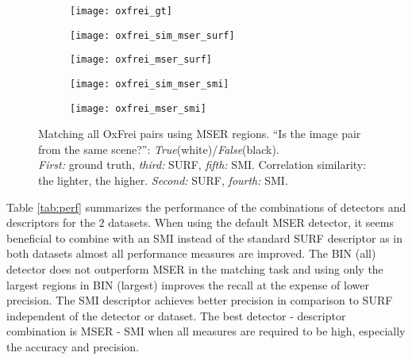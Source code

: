 \documentclass[a4paper,11pt]{article}
\begin{document}
\begin{figure}[h]
 \vspace{-10pt} 
\begin{center}
\begin{subfigure}[b]{0.18\textwidth}
  \texttt{[image: oxfrei\_gt]}
\end{subfigure}
\begin{subfigure}[b]{0.18\textwidth}
\texttt{[image: oxfrei\_sim\_mser\_surf]}
\end{subfigure}
\begin{subfigure}[b]{0.18\textwidth}
  \texttt{[image: oxfrei\_mser\_surf]}
\end{subfigure}
\begin{subfigure}[b]{0.18\textwidth}
\texttt{[image: oxfrei\_sim\_mser\_smi]}
\end{subfigure}
\begin{subfigure}[b]{0.18\textwidth}
  \texttt{[image: oxfrei\_mser\_smi]}
\end{subfigure}
\end{center}
\vspace{-20pt}

\caption{\footnotesize Matching all OxFrei pairs using MSER regions. ``Is the image pair from the same scene?'': {\em True}(white)/{\em False}(black). \\
{\em First:} ground truth, {\em third:} SURF, {\em fifth:} SMI. Correlation similarity: the lighter, the higher. {\em Second:} SURF, {\em fourth:} SMI. }
\label{fig:matching2}
  \vspace{-12pt}
\end{figure}


Table \ref{tab:perf} summarizes the performance of the combinations of detectors and descriptors for the $2$ datasets. When using the default MSER detector, it seems beneficial to combine with an SMI instead of the standard SURF descriptor as in both datasets almost all performance measures are improved. The BIN (all) detector does not outperform MSER in the matching task and using only the largest regions in BIN (largest) improves the recall at the expense of lower precision. The SMI descriptor achieves better precision in comparison to SURF independent of the detector or dataset. The best detector - descriptor combination is MSER - SMI when all measures are required to be high, especially the accuracy and precision. %
\end{document}
